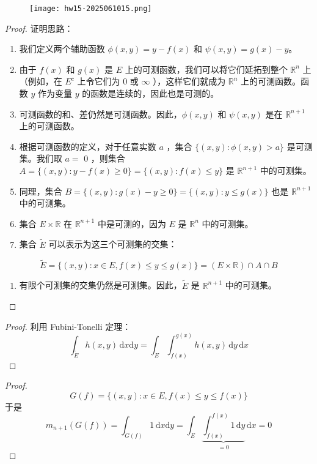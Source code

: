 \begin{exercise}
\begin{figure}[H]
\centering
\texttt{[image: hw15-2025061015.png]}
\label{}
\end{figure}
\end{exercise}
\begin{proof}
证明思路：

\begin{enumerate}
	\item 我们定义两个辅助函数 $\phi(x, y)=y-f(x)$ 和 $\psi(x, y)=g(x)-y$。
	\item 由于 $f(x)$ 和 $g(x)$ 是 $E$ 上的可测函数，我们可以将它们延拓到整个 $\mathbb{R}^n$ 上（例如，在 $E^c$ 上令它们为 0 或 $\infty$ ），这样它们就成为 $\mathbb{R}^n$ 上的可测函数。函数 $y$ 作为变量 $y$ 的函数是连续的，因此也是可测的。
	\item 可测函数的和、差仍然是可测函数。因此，$\phi(x, y)$ 和 $\psi(x, y)$ 是在 $\mathbb{R}^{n+1}$ 上的可测函数。
	\item 根据可测函数的定义，对于任意实数 $a$ ，集合 $\{(x, y): \phi(x, y)>a\}$ 是可测集。我们取 $a=$ 0 ，则集合 $A=\{(x, y): y-f(x) \geq 0\}=\{(x, y): f(x) \leq y\}$ 是 $\mathbb{R}^{n+1}$ 中的可测集。
	\item 同理，集合 $B=\{(x, y): g(x)-y \geq 0\}=\{(x, y): y \leq g(x)\}$ 也是 $\mathbb{R}^{n+1}$ 中的可测集。
	\item 集合 $E \times \mathbb{R}$ 在 $\mathbb{R}^{n+1}$ 中是可测的，因为 $E$ 是 $\mathbb{R}^n$ 中的可测集。
	\item 集合 $\tilde{E}$ 可以表示为这三个可测集的交集：
\end{enumerate}
\[
	\tilde{E}=\{(x, y): x \in E, f(x) \leq y \leq g(x)\}=(E \times \mathbb{R}) \cap A \cap B
\]
\begin{enumerate}
	\item 有限个可测集的交集仍然是可测集。因此，$\tilde{E}$ 是 $\mathbb{R}^{n+1}$ 中的可测集。
\end{enumerate}

\end{proof}
\begin{proof}
利用 Fubini-Tonelli 定理：
\[
\int_{\widetilde{E}}^{} h(x,y) \, \mathrm{d}x \mathrm{d}y=\int_{E}^{} \int_{f(x)}^{g(x)} h(x,y) \, \mathrm{d}y  \, \mathrm{d}x
\]
\end{proof}

\begin{proof}
\[
G(f)=\{ (x,y):x\in E ,f(x)\leq y\leq f(x)\}
\]
于是
\[
m_{n+1}(G(f))=\int_{G(f)}^{} 1 \, \mathrm{d}x \mathrm{d}y=\int_{E}^{} \underbrace{ \int_{f(x)}^{f(x)} 1 \, \mathrm{d}y }_{ =0 }  \, \mathrm{d}x=0 
\]
\end{proof}

